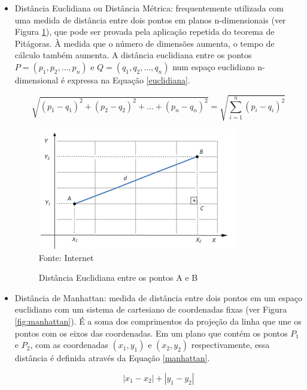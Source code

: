 \begin{itemize}
    \item Distância Euclidiana ou Distância Métrica: frequentemente utilizada com uma medida de distância entre dois pontos em planos n-dimensionais (ver Figura \ref{fig:euclidiana}), que pode ser provada pela aplicação repetida do teorema de Pitágoras. À medida que o número de dimensões aumenta, o tempo de cálculo também aumenta. A distância euclidiana entre os pontos \({P=(p_{1},p_{2},\ldots,p_{n})}\) e \({Q=(q_{1},q_{2},\ldots, q_{n})}\) num espaço euclidiano n-dimensional é expressa na Equação \ref{euclidiana}.
    
    \begin{equation} \label{euclidiana}
        \sqrt {(p_{1}-q_{1})^{2}+(p_{2}-q_{2})^{2}+\ldots +(p_{n}-q_{n})^{2}}=\sqrt {\sum _{i=1}^{n}(p_{i}-q_{i})^{2}}
    \end{equation}
    
    \begin{figure}[!htb]
       \centering
       \caption{Distância Euclidiana entre os pontos A e B}\label{fig:euclidiana} 
       \includegraphics[scale=0.85]{figuras/euclidiana.png}
       \\Fonte: Internet
    \end{figure}
    
    \item Distância de Manhattan: medida de distância entre dois pontos em um espaço euclidiano com um sistema de cartesiano de coordenadas fixas (ver Figura \ref{fig:manhattan}). É a soma dos comprimentos da projeção da linha que une os pontos com os eixos das coordenadas. Em um plano que contém os pontos \({P_{1}}\) e \({P_{2}}\), com as coordenadas \({(x_{1},y_{1})}\) e \({(x_{2},y_{2})}\) respectivamente, essa distância é definida através da Equação \ref{manhattan}.
    
    \begin{equation} \label{manhattan}
        \left|x_{1}-x_{2}\right|+\left|y_{1}-y_{2}\right|
    \end{equation}
    

\end{itemize}
